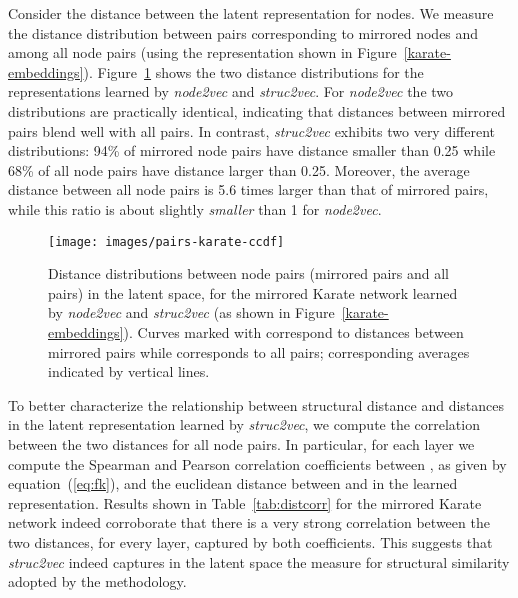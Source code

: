 \documentclass[sigconf]{acmart}
\begin{document}
Consider the distance between the latent representation for nodes. We measure the distance distribution between pairs corresponding to mirrored nodes and among all node pairs (using the representation shown in Figure~\ref{karate-embeddings}). Figure~\ref{karate-ccdf} shows the two distance distributions for the representations learned by \textit{node2vec} and \textit{struc2vec}. For \textit{node2vec} the two distributions are practically identical, indicating that distances between mirrored pairs blend well with all pairs. In contrast, \textit{struc2vec} exhibits two very different distributions: 94\% of mirrored node pairs have distance smaller than 0.25 while 68\% of all node pairs have distance larger than 0.25. Moreover, the average distance between all node pairs is 5.6 times larger than that of mirrored pairs, while this ratio is about slightly {\em smaller} than 1 for \textit{node2vec}. 

\begin{figure}
\texttt{[image: images/pairs-karate-ccdf]} 
\caption{Distance distributions between node pairs (mirrored pairs and all pairs) in the latent space, for the mirrored Karate network learned by \textit{node2vec} and \textit{struc2vec} (as shown in Figure~\ref{karate-embeddings}). Curves marked with  correspond to distances between mirrored pairs while  corresponds to all pairs; corresponding averages indicated by vertical lines.}
\label{karate-ccdf}
\end{figure}

To better characterize the relationship between structural distance and distances in the latent representation learned by \textit{struc2vec}, we compute the correlation between the two distances for all node pairs. In particular, for each layer  we compute the Spearman and Pearson correlation coefficients between , as given by equation~(\ref{eq:fk}), and the euclidean distance between  and  in the learned representation. Results shown in Table~\ref{tab:distcorr} for the mirrored Karate network indeed corroborate that there is a very strong correlation between the two distances, for every layer, captured by both coefficients. This suggests that \textit{struc2vec} indeed captures in the latent space the measure for structural similarity adopted by the methodology. 
\end{document}
